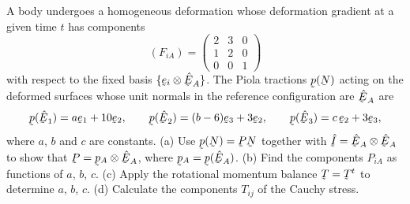 \begin{problem}
A body undergoes a homogeneous deformation whose deformation gradient
at a given time $t$ has components
\[
   (F_{iA})=\begin{pmatrix}2&3&0\\1&2&0\\0&0&1\end{pmatrix}
\]
with respect to the fixed basis $\{\be_{i}\otimes\hbE_{A}\}$. The Piola
tractions $\bp(\bN)$ acting on the deformed surfaces whose unit normals
in the reference configuration are $\hbE_{A}$ are
\[
   \bp(\hbE_{1})=a\be_{1}+10\be_{2},\qquad
   \bp(\hbE_{2})=(b-6)\be_{3}+3\be_{2},\qquad
   \bp(\hbE_{3})=c\,\be_{2}+3\be_{3},
\]
where $a$, $b$ and $c$ are constants.
\textup{(a)} Use $\bp(\bN)=\bP\bN$ together with
$\hI=\hbE_{A}\otimes\hbE_{A}$ to show that
$\bP=\bp_{A}\otimes\hbE_{A}$, where $\bp_{A}=\bp(\hbE_{A})$.
\textup{(b)} Find the components $P_{iA}$ as functions of $a$, $b$,
$c$.
\textup{(c)} Apply the rotational momentum balance $\bT=\bT^{t}$ to
determine $a$, $b$, $c$.
\textup{(d)} Calculate the components $T_{ij}$ of the Cauchy stress.
\end{problem}

